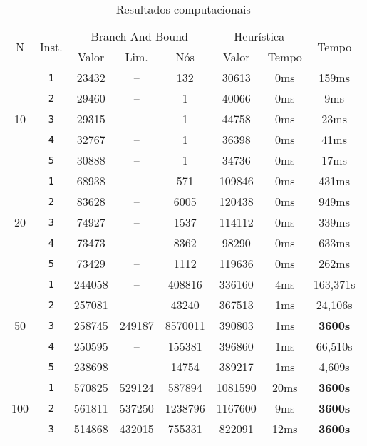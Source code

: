 \documentclass{article}
\begin{document}
\begin{table}[ht]
    \centering
    \begin{tabular}{c|c|c|c|c|c|c|c}
        \hline
        \multirow{2}{0.6cm}{N}&\multirow{2}{1cm}{Inst.} & \multicolumn{3}{c|}{Branch-And-Bound} & \multicolumn{2}{c|}{Heurística} & \multirow{2}{1.15cm}{Tempo}\\
        \cline{3-7}
        &&Valor & Lim. & Nós & Valor & Tempo \\
        \hline\hline

        \multirow{5}{0.6cm}{10}
        &{\tt 1} & 23432 & -- & 132 & 30613 & 0ms & 159ms\\
        &{\tt 2} & 29460 & -- & 1 & 40066 & 0ms & 9ms \\
        &{\tt 3} & 29315 & -- & 1 & 44758 & 0ms & 23ms \\
        &{\tt 4} & 32767 & -- & 1 & 36398 & 0ms & 41ms \\
        &{\tt 5} & 30888 & -- & 1 & 34736 & 0ms & 17ms \\

        \hline\multirow{5}{0.6cm}{20}
        &{\tt 1} & 68938 & -- & 571 & 109846 & 0ms & 431ms\\
        &{\tt 2} & 83628 & -- & 6005 & 120438 & 0ms & 949ms \\
        &{\tt 3} & 74927 & -- & 1537 & 114112 & 0ms & 339ms \\
        &{\tt 4} & 73473 & -- & 8362 & 98290 & 0ms & 633ms \\
        &{\tt 5} & 73429 & -- & 1112 & 119636 & 0ms & 262ms\\

        \hline\multirow{5}{0.6cm}{50}
        &{\tt 1} & 244058 & -- & 408816 & 336160 & 4ms & 163,371s\\
        &{\tt 2} & 257081 & -- & 43240 & 367513 & 1ms & 24,106s \\
        &{\tt 3} & 258745 & 249187 & 8570011 & 390803 & 1ms & {\bf 3600s} \\
        &{\tt 4} & 250595 & -- & 155381 & 396860 & 1ms & 66,510s \\
        &{\tt 5} & 238698 & -- & 14754 & 389217 & 1ms & 4,609s\\

        \hline\multirow{3}{0.6cm}{100}
        &{\tt 1} & 570825 & 529124 & 587894 & 1081590 & 20ms & {\bf 3600s}\\
        &{\tt 2} & 561811 & 537250 & 1238796 & 1167600 & 9ms & {\bf 3600s} \\
        &{\tt 3} & 514868 & 432015 & 755331 & 822091 & 12ms & {\bf 3600s} \\\hline
    \end{tabular}
    \caption{Resultados computacionais}
    \label{tab:computational-results}
\end{table}
\end{document}
